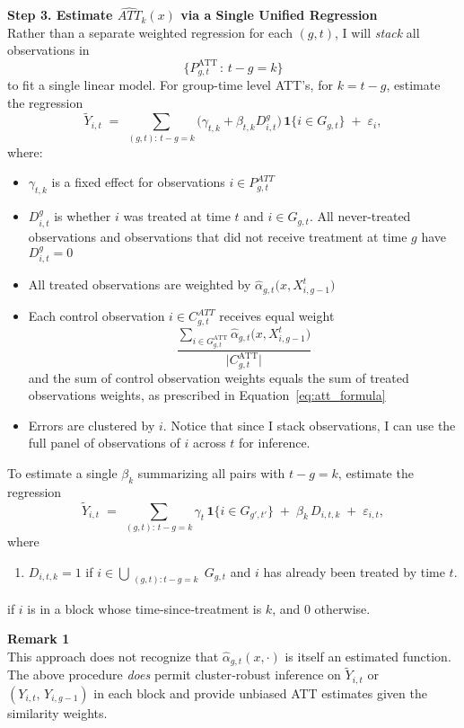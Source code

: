 \documentclass[source/paper/main.tex]{subfiles}
\begin{document}
\noindent\textbf{Step 3. Estimate $\widehat{ATT}_{k}(x)$ via a Single Unified Regression}\\
Rather than a separate weighted regression for each $(g,t)$, I will \emph{stack} all observations in 
\[
  \bigl\{
    P_{g,t}^{\mathrm{ATT}}
    \,\colon\,
    t-g = k
  \bigr\}
\]
to fit a single linear model. For group-time level ATT's, for $k = t-g$, estimate the regression 
\[
  \tilde{Y}_{i,t}
  \;=\;
  \sum_{(g,t):\,t-g=k}
        \bigl(\gamma_{t,k} + \beta_{t,k}D_{i,t}^g \bigr)\,\mathbf{1}\{i \in G_{g,t}\} 
  \;+\;
  \varepsilon_{i},
\]
where:
\begin{itemize}
\item $\gamma_{t,k}$ is a fixed effect for observations $i \in P_{g,t}^{ATT}$
\item $D_{i,t}^g$ is whether $i$ was treated at time $t$ and $i \in G_{g,t}$. All never-treated observations and observations that did not receive treatment at time $g$ have $D_{i,t}^g = 0$
\item All treated observations are weighted by $\widehat{\alpha}_{g,t}\bigl(x,X_{i,g-1}^{t}\bigr)$
\item Each control observation $i \in C_{g,t}^{ATT}$ receives equal weight 
\[
\frac{\displaystyle \sum_{i \in G_{g,t}^{\mathrm{ATT}}} \widehat{\alpha}_{g,t}\bigl(x, X_{i,g-1}^{t}\bigr)}
{\bigl|C_{g,t}^{\mathrm{ATT}}\bigr|}
\]
and the sum of control observation weights equals the sum of treated observations weights, as prescribed in Equation~\ref{eq:att_formula}
\item Errors are clustered by $i$. Notice that since I stack observations, I can use the full panel of observations of $i$ across $t$ for inference. 
\end{itemize}
To estimate a single $\beta_k$ summarizing all pairs with $t-g = k$, estimate the regression
\[
  \tilde{Y}_{i,t}
  \;=\;
  \sum_{(g,t):\,t-g=k}
    \gamma_{t}\,\mathbf{1}\{i \in G_{g',t'}\}
  \;+\;
  \beta_k\,D_{i,t,k}
  \;+\;
  \varepsilon_{i,t},
\]
where
\begin{enumerate}
    \item $D_{i,t,k} = 1$ if $i \in \bigcup_{\substack{(g,t): t-g = k}} G_{g,t}$ and $i$ has already been treated by time $t$. 
\end{enumerate}if $i$ is in a block whose time‐since‐treatment is $k$, and 0 otherwise.

\noindent
\textbf{Remark 1}\\
This approach does not recognize that $\widehat{\alpha}_{g,t}(x,\cdot)$ is itself an estimated function. The above procedure \emph{does} permit cluster‐robust inference on $\tilde{Y}_{i,t}$ or $(Y_{i,t},\,Y_{i,g-1})$ in each block and provide unbiased ATT estimates given the similarity weights. 
\end{document}
